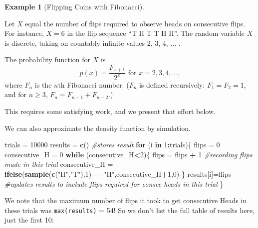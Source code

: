 \documentclass[
]{book}
\newenvironment{Shaded}{\begin{snugshade}}{\end{snugshade}}
\newcommand{\CommentTok}[1]{\textcolor[rgb]{0.56,0.35,0.01}{\textit{#1}}}
\newcommand{\ControlFlowTok}[1]{\textcolor[rgb]{0.13,0.29,0.53}{\textbf{#1}}}
\newcommand{\DecValTok}[1]{\textcolor[rgb]{0.00,0.00,0.81}{#1}}
\newcommand{\FunctionTok}[1]{\textcolor[rgb]{0.13,0.29,0.53}{\textbf{#1}}}
\newcommand{\NormalTok}[1]{#1}
\newcommand{\OtherTok}[1]{\textcolor[rgb]{0.56,0.35,0.01}{#1}}
\newcommand{\SpecialCharTok}[1]{\textcolor[rgb]{0.81,0.36,0.00}{\textbf{#1}}}
\newcommand{\StringTok}[1]{\textcolor[rgb]{0.31,0.60,0.02}{#1}}
\theoremstyle{definition}
\theoremstyle{definition}
\newtheorem{example}{Example}[chapter]
\theoremstyle{definition}
\theoremstyle{definition}
\theoremstyle{remark}
\begin{document}
\begin{example}[Flipping Coins with Fibonacci]
\protect\hypertarget{exm:flip-with-fib-R}{}\label{exm:flip-with-fib-R}

Let \(X\) equal the number of flips required to observe heads on consecutive flips. For instance, \(X = 6\) in the flip sequence ``T H T T H H''. The random variable \(X\) is discrete, taking on countably infinite values 2, 3, 4, \(\ldots\) .

The probability function for \(X\) is \[p(x) = \frac{F_{x+1}}{2^x} \text{     for } x = 2, 3, 4, \ldots,\] where \(F_n\) is the \(n\)th Fibonacci number. (\(F_n\) is defined recursively: \(F_1 = F_2 = 1\), and for \(n \geq 3\), \(F_n = F_{n-1}+F_{n-2}\).)

This requires some satisfying work, and we present that effort below.

We can also approximate the density function by simulation.

\begin{Shaded}
\begin{Highlighting}[]
\NormalTok{trials }\OtherTok{=} \DecValTok{10000}
\NormalTok{results }\OtherTok{=} \FunctionTok{c}\NormalTok{() }\CommentTok{\#stores result}
\ControlFlowTok{for}\NormalTok{ (i }\ControlFlowTok{in} \DecValTok{1}\SpecialCharTok{:}\NormalTok{trials)\{}
\NormalTok{  flips }\OtherTok{=} \DecValTok{0}
\NormalTok{  consecutive\_H }\OtherTok{=} \DecValTok{0}
  \ControlFlowTok{while}\NormalTok{ (consecutive\_H}\SpecialCharTok{\textless{}}\DecValTok{2}\NormalTok{)\{}
\NormalTok{    flips }\OtherTok{=}\NormalTok{ flips }\SpecialCharTok{+} \DecValTok{1} \CommentTok{\#recording flips made in this trial}
\NormalTok{    consecutive\_H }\OtherTok{=} \FunctionTok{ifelse}\NormalTok{(}\FunctionTok{sample}\NormalTok{(}\FunctionTok{c}\NormalTok{(}\StringTok{"H"}\NormalTok{,}\StringTok{"T"}\NormalTok{),}\DecValTok{1}\NormalTok{)}\SpecialCharTok{==}\StringTok{"H"}\NormalTok{,consecutive\_H}\SpecialCharTok{+}\DecValTok{1}\NormalTok{,}\DecValTok{0}\NormalTok{)}
\NormalTok{  \}}
\NormalTok{  results[i]}\OtherTok{=}\NormalTok{flips }\CommentTok{\#updates results to include flips required for consec heads in this trial}
\NormalTok{\}}
\end{Highlighting}
\end{Shaded}

We note that the maximum number of flips it took to get consecutive Heads in these trials was \texttt{max(results)} = 54! So we don't list the full table of results here, just the first 10:


\end{example}
\end{document}
